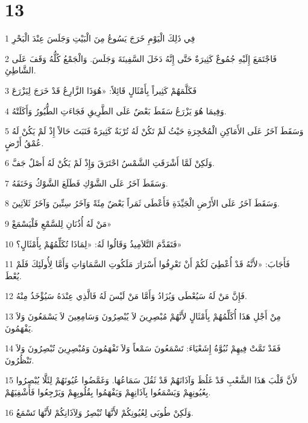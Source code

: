 \chapter{13}

\par 1 فِي ذَلِكَ الْيَوْمِ خَرَجَ يَسُوعُ مِنَ الْبَيْتِ وَجَلَسَ عِنْدَ الْبَحْرِ
\par 2 فَاجْتَمَعَ إِلَيْهِ جُمُوعٌ كَثِيرَةٌ حَتَّى إِنَّهُ دَخَلَ السَّفِينَةَ وَجَلَسَ. وَالْجَمْعُ كُلُّهُ وَقَفَ عَلَى الشَّاطِئِ.
\par 3 فَكَلَّمَهُمْ كَثِيراً بِأَمْثَالٍ قَائِلاً: «هُوَذَا الزَّارِعُ قَدْ خَرَجَ لِيَزْرَعَ
\par 4 وَفِيمَا هُوَ يَزْرَعُ سَقَطَ بَعْضٌ عَلَى الطَّرِيقِ فَجَاءَتِ الطُّيُورُ وَأَكَلَتْهُ.
\par 5 وَسَقَطَ آخَرُ عَلَى الأَمَاكِنِ الْمُحْجِرَةِ حَيْثُ لَمْ تَكُنْ لَهُ تُرْبَةٌ كَثِيرَةٌ فَنَبَتَ حَالاً إِذْ لَمْ يَكُنْ لَهُ عُمْقُ أَرْضٍ.
\par 6 وَلَكِنْ لَمَّا أَشْرَقَتِ الشَّمْسُ احْتَرَقَ وَإِذْ لَمْ يَكُنْ لَهُ أَصْلٌ جَفَّ.
\par 7 وَسَقَطَ آخَرُ عَلَى الشَّوْكِ فَطَلَعَ الشَّوْكُ وَخَنَقَهُ.
\par 8 وَسَقَطَ آخَرُ عَلَى الأَرْضِ الْجَيِّدَةِ فَأَعْطَى ثَمَراً بَعْضٌ مِئَةً وَآخَرُ سِتِّينَ وَآخَرُ ثَلاَثِينَ.
\par 9 مَنْ لَهُ أُذُنَانِ لِلسَّمْعِ فَلْيَسْمَعْ»
\par 10 فَتَقَدَّمَ التَّلاَمِيذُ وَقَالُوا لَهُ: «لِمَاذَا تُكَلِّمُهُمْ بِأَمْثَالٍ؟»
\par 11 فَأَجَابَ: «لأَنَّهُ قَدْ أُعْطِيَ لَكُمْ أَنْ تَعْرِفُوا أَسْرَارَ مَلَكُوتِ السَّمَاوَاتِ وَأَمَّا لِأُولَئِكَ فَلَمْ يُعْطَ.
\par 12 فَإِنَّ مَنْ لَهُ سَيُعْطَى وَيُزَادُ وَأَمَّا مَنْ لَيْسَ لَهُ فَالَّذِي عِنْدَهُ سَيُؤْخَذُ مِنْهُ.
\par 13 مِنْ أَجْلِ هَذَا أُكَلِّمُهُمْ بِأَمْثَالٍ لأَنَّهُمْ مُبْصِرِينَ لاَ يُبْصِرُونَ وَسَامِعِينَ لاَ يَسْمَعُونَ وَلاَ يَفْهَمُونَ.
\par 14 فَقَدْ تَمَّتْ فِيهِمْ نُبُوَّةُ إِشَعْيَاءَ: تَسْمَعُونَ سَمْعاً وَلاَ تَفْهَمُونَ وَمُبْصِرِينَ تُبْصِرُونَ وَلاَ تَنْظُرُونَ.
\par 15 لأَنَّ قَلْبَ هَذَا الشَّعْبِ قَدْ غَلُظَ وَآذَانَهُمْ قَدْ ثَقُلَ سَمَاعُهَا. وَغَمَّضُوا عُيُونَهُمْ لِئَلَّا يُبْصِرُوا بِعُيُونِهِمْ وَيَسْمَعُوا بِآذَانِهِمْ وَيَفْهَمُوا بِقُلُوبِهِمْ وَيَرْجِعُوا فَأَشْفِيَهُمْ.
\par 16 وَلَكِنْ طُوبَى لِعُيُونِكُمْ لأَنَّهَا تُبْصِرُ وَلِآذَانِكُمْ لأَنَّهَا تَسْمَعُ.
